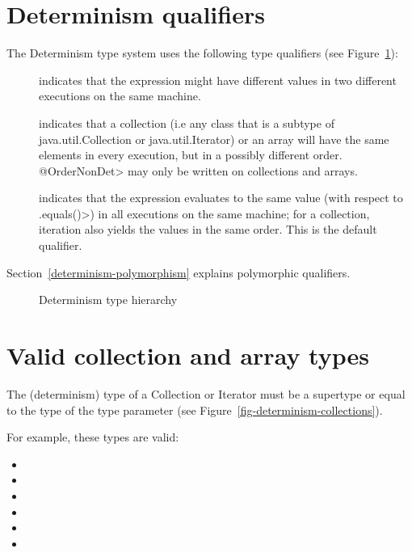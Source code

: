 \section{Determinism qualifiers\label{determinism-qualifiers}}

The Determinism type system uses the following type qualifiers (see Figure~\ref{fig-determinism-hierarchy}):
\begin{description}
\item[] indicates
  that the expression might have different values in two different executions on the same machine.
\item[] indicates that
  a collection (i.e any class that is a subtype of java.util.Collection or java.util.Iterator) or an array will have the same elements in every execution, but in a
  possibly different order.  \<@OrderNonDet> may only be written on
  collections and arrays.
\item[] indicates that
  the expression evaluates to the same value (with respect to \<.equals()>) in all
  executions on the same machine; for a collection, iteration also yields the values in the same
  order.
  This is the default qualifier.
\end{description}

Section~\ref{determinism-polymorphism} explains polymorphic qualifiers.

\begin{figure}
  \begin{center}
  \end{center}
\caption{Determinism type hierarchy}
\label{fig-determinism-hierarchy}
\end{figure}


\section{Valid collection and array types\label{determinism-collection-types}}

The (determinism) type of a Collection or Iterator must be a supertype or equal to
the type of the type parameter (see Figure~\ref{fig-determinism-collections}).

For example, these types are valid:
\begin{itemize}
    \item {}
    \item {}
    \item {}
    \item {}
    \item {}
    \item {}
\end{itemize}

